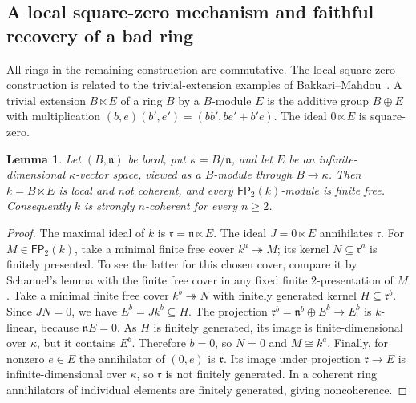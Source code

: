 \documentclass[11pt]{article}
\numberwithin{equation}{section}
\newtheorem{lemma}[theorem]{Lemma}
\theoremstyle{definition}
\theoremstyle{remark}
\newcommand{\FP}{\mathsf{FP}}
\begin{document}
\subsection{A local square-zero mechanism and faithful recovery of a bad ring}

All rings in the remaining construction are commutative.  The local square-zero construction is related to the trivial-extension
examples of Bakkari--Mahdou~\cite{BakkariMahdou}.
A trivial extension $B\ltimes E$ of a ring $B$ by a $B$-module $E$ is the additive
group $B\oplus E$ with multiplication
$(b,e)(b',e')=(bb',be'+b'e)$.  The ideal $0\ltimes E$ is square-zero.

\begin{lemma}\label{neg:lem:local}
Let $(B,\mathfrak n)$ be local, put $\kappa=B/\mathfrak n$,
and let $E$ be an infinite-dimensional $\kappa$-vector space, viewed
as a $B$-module through $B\to\kappa$.  Then $k=B\ltimes E$ is local and
not coherent, and every $\FP_2(k)$-module is finite free.  Consequently
$k$ is strongly $n$-coherent for every $n\ge2$.
\end{lemma}
\begin{proof}
The maximal ideal of $k$ is $\mathfrak r=\mathfrak n\ltimes E$.
The ideal $J=0\ltimes E$ annihilates $\mathfrak r$.
For $M\in\FP_2(k)$, take a minimal finite free cover
$k^a\twoheadrightarrow M$; its kernel $N\subseteq\mathfrak r^a$ is
finitely presented.  To see the latter for this chosen cover, compare
it by Schanuel's lemma with the finite free cover in any fixed finite
$2$-presentation of $M$.
Take a minimal finite free cover $k^b\twoheadrightarrow N$ with
finitely generated kernel $H\subseteq\mathfrak r^b$.  Since $JN=0$,
we have $E^b=Jk^b\subseteq H$.  The projection
$\mathfrak r^b=\mathfrak n^b\oplus E^b\to E^b$ is $k$-linear, because
$\mathfrak n E=0$.  As $H$ is finitely generated, its image is
finite-dimensional over $\kappa$, but it contains $E^b$.  Therefore
$b=0$, so $N=0$ and $M\cong k^a$.
Finally, for nonzero $e\in E$ the annihilator of $(0,e)$ is
$\mathfrak r$.  Its image under projection $\mathfrak r\to E$ is
infinite-dimensional over $\kappa$, so $\mathfrak r$ is not finitely
generated.  In a coherent ring annihilators of individual elements are
finitely generated, giving noncoherence.
\end{proof}
\end{document}
